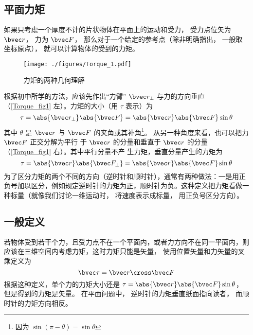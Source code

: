 

\subsection{平面力矩}

如果只考虑一个厚度不计的片状物体在平面上的运动和受力， 受力点位矢为 $\bvec r$， 力为 $\bvec F$， 那么对于一个给定的参考点（除非明确指出， 一般取坐标原点）， 就可以计算物体的受到的力矩。

\begin{figure}[ht]
\centering
\texttt{[image: ./figures/Torque\_1.pdf]}
\caption{力矩的两种几何理解}\label{Torque_fig1}
\end{figure}

根据初中所学的方法，应该先作出“力臂” $\bvec r_ \bot$ 与力的方向垂直（\autoref{Torque_fig1} 左）。力矩的大小（用 $\tau$ 表示）为
\begin{equation}\label{Torque_eq2}
\tau = \abs{\bvec r_ \bot } \abs{\bvec F} = \abs{\bvec r} \abs{\bvec F} \sin \theta 
\end{equation}
其中 $\theta $ 是 $\bvec r$ 与 $\bvec F$ 的夹角或其补角\footnote{因为 $\sin(\pi - \theta) = \sin\theta$}。 从另一种角度来看，也可以把力 $\bvec F$ 正交分解为平行
于 $\bvec r$ 的分量和垂直于 $\bvec r$ 的分量（\autoref{Torque_fig1} 右）。其中平行分量不产
生力矩，垂直分量产生的力矩为
\begin{equation}\label{Torque_eq1}
\tau = \abs{\bvec r} \abs{\bvec F_ \bot } = \abs{\bvec r} \abs{\bvec F} \sin \theta 
\end{equation}
为了区分力矩的两个不同的方向（逆时针和顺时针），通常有两种做法：一是用正负号加以区分，例如规定逆时针的力矩为正，顺时针为负。这种定义把力矩看做一种标量（就像我们讨论一维运动时， 将速度表示成标量， 用正负号区分方向）。

\subsection{一般定义}
若物体受到若干个力，且受力点不在一个平面内，或者力方向不在同一平面内，则应该在三维空间内考虑力矩，这时力矩只能是矢量， 使用位置矢量和力矢量的叉乘定义为
\begin{equation}\label{Torque_eq3}
\bvec \tau = \bvec r \cross \bvec F
\end{equation}
根据这种定义，单个力的力矩大小还是 $\tau = \abs{\bvec r} \abs{\bvec F}\sin \theta$， 但是得到的力矩是矢量。 在平面问题中， 逆时针的力矩垂直纸面指向读者， 而顺时针的力矩方向相反。

